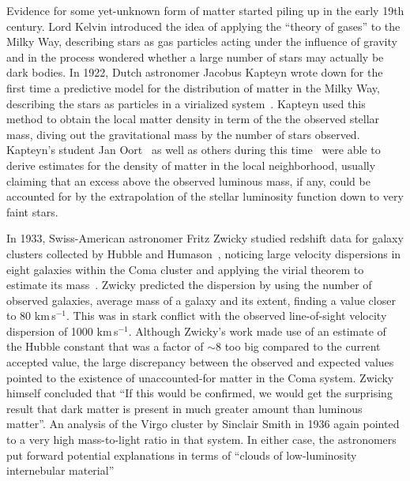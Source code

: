 Evidence for some yet-unknown form of matter started piling up in the early 19th century. Lord Kelvin introduced the idea of applying the ``theory of gases'' to the Milky Way, describing stars as gas particles acting under the influence of gravity and in the process wondered whether a large number of stars may actually be dark bodies. In 1922, Dutch astronomer Jacobus Kapteyn wrote down for the first time a predictive model for the distribution of matter in the Milky Way, describing the stars as particles in a virialized system~\cite{1922ApJ....55..302K}. Kapteyn used this method to obtain the local matter density in term of the the observed stellar mass, diving out the gravitational mass by the number of stars observed. Kapteyn's student Jan Oort~\cite{1932BAN.....6..249O} as well as others during this time~\cite{1922MNRAS..82..122J} were able to derive estimates for the density of matter in the local neighborhood, usually claiming that an excess above the observed luminous mass, if any, could be accounted for by the extrapolation of the stellar luminosity function down to very faint stars.

In 1933, Swiss-American astronomer Fritz Zwicky studied redshift data for galaxy clusters collected by Hubble and Humason~\cite{1931ApJ....74...43H}, noticing large velocity dispersions in eight galaxies within the Coma cluster and applying the virial theorem to estimate its mass~\cite{1933AcHPh...6..110Z}. Zwicky predicted the dispersion by using the number of observed galaxies, average mass of a galaxy and its extent, finding a value closer to 80 km\,s$^{-1}$. This was in stark conflict with the observed line-of-sight velocity dispersion of 1000 km\,s$^{-1}$. Although Zwicky's work made use of an estimate of the Hubble constant that was a factor of $\sim$8 too big compared to the current accepted value, the large discrepancy between the observed and expected values pointed to the existence of unaccounted-for matter in the Coma system. Zwicky himself concluded that ``If this would be confirmed, we would get the surprising result that dark matter is present in much greater amount than luminous matter''. An analysis of the Virgo cluster by Sinclair Smith in 1936 again pointed to a very high mass-to-light ratio in that system. In either case, the astronomers put forward potential explanations in terms of ``clouds of low-luminosity internebular material''~\cite{1937ApJ....86..217Z}

